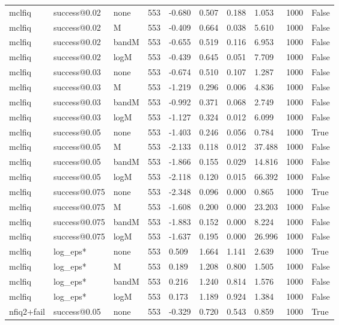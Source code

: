\begin{tabular}{llllllllll}
mclfiq & success@0.02 & none & 553 & -0.680 & 0.507 & 0.188 & 1.053 & 1000 & False \\
mclfiq & success@0.02 & M & 553 & -0.409 & 0.664 & 0.038 & 5.610 & 1000 & False \\
mclfiq & success@0.02 & bandM & 553 & -0.655 & 0.519 & 0.116 & 6.953 & 1000 & False \\
mclfiq & success@0.02 & logM & 553 & -0.439 & 0.645 & 0.051 & 7.709 & 1000 & False \\
mclfiq & success@0.03 & none & 553 & -0.674 & 0.510 & 0.107 & 1.287 & 1000 & False \\
mclfiq & success@0.03 & M & 553 & -1.219 & 0.296 & 0.006 & 4.836 & 1000 & False \\
mclfiq & success@0.03 & bandM & 553 & -0.992 & 0.371 & 0.068 & 2.749 & 1000 & False \\
mclfiq & success@0.03 & logM & 553 & -1.127 & 0.324 & 0.012 & 6.099 & 1000 & False \\
mclfiq & success@0.05 & none & 553 & -1.403 & 0.246 & 0.056 & 0.784 & 1000 & True \\
mclfiq & success@0.05 & M & 553 & -2.133 & 0.118 & 0.012 & 37.488 & 1000 & False \\
mclfiq & success@0.05 & bandM & 553 & -1.866 & 0.155 & 0.029 & 14.816 & 1000 & False \\
mclfiq & success@0.05 & logM & 553 & -2.118 & 0.120 & 0.015 & 66.392 & 1000 & False \\
mclfiq & success@0.075 & none & 553 & -2.348 & 0.096 & 0.000 & 0.865 & 1000 & True \\
mclfiq & success@0.075 & M & 553 & -1.608 & 0.200 & 0.000 & 23.203 & 1000 & False \\
mclfiq & success@0.075 & bandM & 553 & -1.883 & 0.152 & 0.000 & 8.224 & 1000 & False \\
mclfiq & success@0.075 & logM & 553 & -1.637 & 0.195 & 0.000 & 26.996 & 1000 & False \\
mclfiq & log\_eps* & none & 553 & 0.509 & 1.664 & 1.141 & 2.639 & 1000 & True \\
mclfiq & log\_eps* & M & 553 & 0.189 & 1.208 & 0.800 & 1.505 & 1000 & False \\
mclfiq & log\_eps* & bandM & 553 & 0.216 & 1.240 & 0.814 & 1.576 & 1000 & False \\
mclfiq & log\_eps* & logM & 553 & 0.173 & 1.189 & 0.924 & 1.384 & 1000 & False \\
nfiq2+fail & success@0.05 & none & 553 & -0.329 & 0.720 & 0.543 & 0.859 & 1000 & True \\

\end{tabular}
